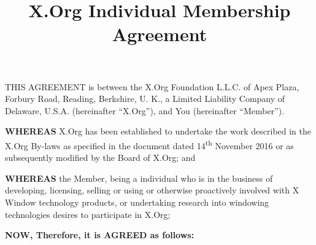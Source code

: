 \documentclass[10pt, english]{xorgdocs}
\newcommand\nth{\textsuperscript{th}\xspace} %
\begin{document}
\title{X.Org Individual Membership Agreement}
\maketitle
\date{}

THIS AGREEMENT is between the X.Org Foundation L.L.C. of Apex Plaza, Forbury
Road, Reading, Berkshire, U. K., a Limited Liability Company of Delaware,
U.S.A. (hereinafter ``X.Org''), and You (hereinafter ``Member'').

\textbf{WHEREAS} X.Org has been established to undertake the work described
in the X.Org By-laws as specified in the document dated 14\nth November 2016
or as subsequently modified by the Board of X.Org; and

\textbf{WHEREAS} the Member, being a individual who is in the business of
developing, licensing, selling or using or otherwise proactively involved
with X Window technology products, or undertaking research into windowing
technologies desires to participate in X.Org;

\textbf{NOW, Therefore, it is AGREED as follows:}
\end{document}
